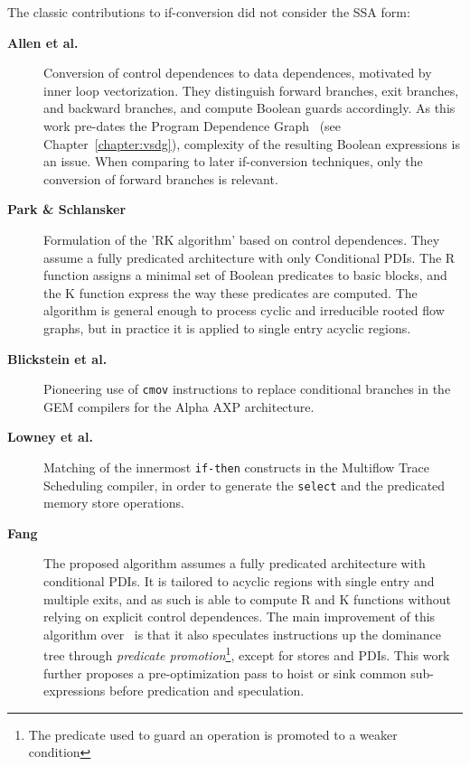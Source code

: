 \medskip
The classic contributions to if-conversion
did not consider the SSA form: \begin{description}

\item[\textbf{Allen et al.~\cite{Allen:1983:POPL}}] Conversion of control
dependences to data dependences, motivated by inner loop vectorization. They
distinguish forward branches, exit branches, and backward branches, and compute
Boolean guards accordingly. As this work pre-dates the Program Dependence Graph~\cite{ferrantePDG} (see Chapter~\ref{chapter:vsdg}), complexity of the resulting Boolean expressions is
an issue. When comparing to later if-conversion techniques, only the conversion
of forward branches is relevant.

\item[\textbf{Park \& Schlansker~\cite{Park:1991:TR58}}] Formulation of the 'RK
algorithm' based on control dependences. They assume a fully predicated
architecture with only Conditional PDIs. The R function assigns a minimal set of
Boolean predicates to basic blocks, and the K function express the way these
predicates are computed.  The algorithm is general enough to process cyclic and
irreducible rooted flow graphs, but in practice it is applied to single entry
acyclic regions.

\item[\textbf{Blickstein et al.~\cite{Blickstein:1992:DTJ}}] Pioneering use of \texttt{cmov}
instructions to replace conditional branches in the GEM compilers for the Alpha
AXP architecture.

\item[\textbf{Lowney et al.~\cite{Lowney:1993:JS}}] Matching of the innermost \texttt{if-then}
constructs in the Multiflow Trace Scheduling compiler, in order to generate the
\texttt{select} and the predicated memory store operations.

\item[\textbf{Fang~\cite{Fang:1996:LCPC}}] The proposed algorithm assumes a
fully predicated architecture with conditional PDIs. It is tailored to acyclic
regions with single entry and multiple exits, and as such is able to compute R
and K functions without relying on explicit control dependences.  The main
improvement of this algorithm over~\cite{Park:1991:TR58} is that it also
speculates instructions up the dominance tree through \emph{predicate
promotion}\footnote{The predicate used to guard an operation is promoted to a
weaker condition},
except for stores and PDIs. This work further proposes a pre-optimization pass
to hoist or sink common sub-expressions before predication and speculation.


\end{description}

